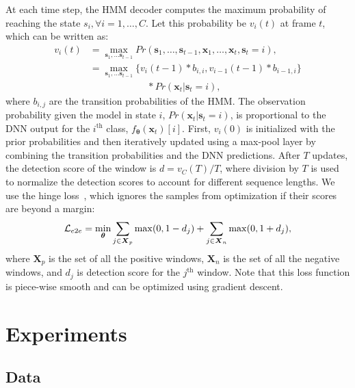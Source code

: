\documentclass{article}
\begin{document}
At each time step, the HMM decoder computes the maximum probability of reaching the state $s_i, \forall i = 1, \dots, C$.
Let this probability be $v_i(t)$ at frame $t$, which can be written as:
\begin{align}
v_i(t) &=\max_{\boldsymbol s_1, \dots \boldsymbol s_{t-1}} Pr(\boldsymbol s_1, \dots, \boldsymbol s_{t-1}, \boldsymbol x_1, \dots, \boldsymbol x_t, \boldsymbol s_t = i), \nonumber \\
&= \max_{\boldsymbol s_1, \dots \boldsymbol s_{t-1}} \{v_i(t-1)*b_{i, i}, v_{i-1}(t-1)*b_{i-1, i}\} \nonumber \\
  & \quad \quad \quad \quad \quad \quad * Pr(\boldsymbol x_t | \boldsymbol s_t=i),
\end{align}
where $b_{i,j}$ are the transition probabilities of the HMM.
The observation probability given the model in state $i$, $Pr(\boldsymbol x_t | \boldsymbol s_t=i)$, is proportional to the DNN output for the $i^{\text{th}}$ class, $f_{\boldsymbol \theta}(\boldsymbol x_t)[i]$.
First, $v_i(0)$ is initialized with the prior probabilities and then iteratively updated using a max-pool layer by combining the transition probabilities and the DNN predictions.
After $T$ updates, the detection score of the window is $d = v_C(T) / T$, where division by $T$ is used to normalize the detection scores to account for different sequence lengths.
We use the hinge loss~\cite{hinge_loss}, which ignores the samples from optimization if their scores are beyond a margin:
\begin{align}
  \mathcal L_{e2e} = \min_{\boldsymbol \theta} \sum_{j \in \mathcal {\boldsymbol X}_p} \max(0, 1 - d_j) + \sum_{j \in \mathcal {\boldsymbol X}_n} \max(0, 1 + d_j),
  \vspace{-0.2in}
  \label{eq:loss_e2e}
\end{align}
where $\mathcal {\boldsymbol X}_p$ is the set of all the positive windows, $\mathcal {\boldsymbol X}_n$ is the set of all the negative windows, and $d_j$ is detection score for the $j^{\text{th}}$ window.
Note that this loss function is piece-wise smooth and can be optimized using gradient descent.
 \section{Experiments}
 
\subsection{Data}
\end{document}
